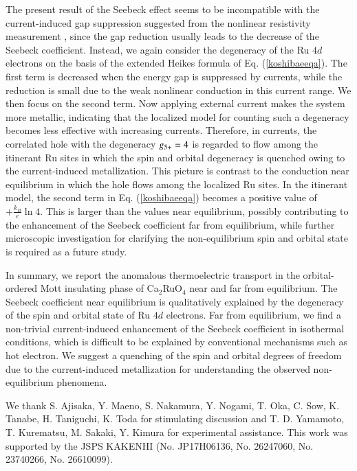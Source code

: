 \documentclass[aps,twocolumn,showpacs,preprintnumbers,amsmath,amssymb,floats,citeautoscript,nobalancelastpage]{revtex4-1}
\begin{document}
The present result of the Seebeck effect seems to be incompatible with the current-induced gap suppression
suggested from the nonlinear resistivity measurement \cite{Okazaki2013},
since the gap reduction usually leads to the decrease of the Seebeck coefficient.
Instead, we again consider the degeneracy of the Ru $4d$ electrons
on the basis of the extended Heikes formula of Eq. (\ref{koshibaeeqa}).
The first term is decreased when the energy gap is suppressed by currents,
while the reduction is small due to the weak nonlinear conduction in this current range.
We then focus on the second term.
Now applying external current makes the system more metallic, indicating that
the localized model for counting such a degeneracy becomes less effective with increasing currents.
Therefore, in currents, 
the correlated hole with the degeneracy $g_{\rm 5+} = 4$ 
is regarded to flow
among the itinerant Ru sites in which the spin and orbital degeneracy is quenched owing to 
the current-induced metallization.
This picture is contrast to the conduction near equilibrium
in which the hole flows among the localized Ru sites.
In the itinerant model, the second term in Eq. (\ref{koshibaeeqa}) becomes a positive value of
$+\frac{k_B}{e}\ln4$.
This is larger than the values near equilibrium, 
possibly contributing to the enhancement of the Seebeck coefficient far from equilibrium,
while further microscopic investigation for clarifying the non-equilibrium spin and orbital state is required as a future study.



In summary, we report the anomalous thermoelectric transport in the orbital-ordered Mott insulating phase of Ca$_2$RuO$_4$
near and far from equilibrium.
The Seebeck coefficient near equilibrium is qualitatively explained by the degeneracy of the spin and orbital state of Ru $4d$ electrons.
Far  from equilibrium, we find a non-trivial current-induced enhancement of the Seebeck coefficient in isothermal conditions,
which is difficult to be explained by conventional mechanisms such as hot electron.
We suggest a
quenching of the spin and orbital degrees of freedom due to
the current-induced metallization for understanding the observed non-equilibrium phenomena.



We thank S. Ajisaka, Y. Maeno, S. Nakamura, Y. Nogami, T. Oka, C. Sow, K. Tanabe, H. Taniguchi, K. Toda for stimulating discussion and 
T. D. Yamamoto, T. Kurematsu, M. Sakaki, Y. Kimura for experimental assistance.
This work was supported by the JSPS KAKENHI (No. JP17H06136, No. 26247060, No. 23740266, No. 26610099).
\end{document}
